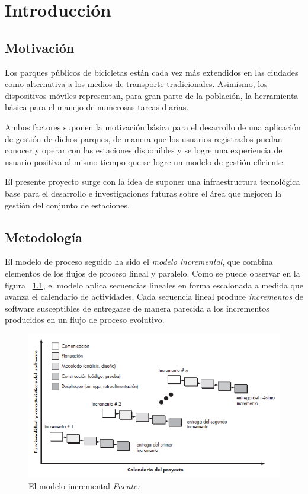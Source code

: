 \chapter{Introducción}

\section{Motivación}

Los parques públicos de bicicletas están cada vez más extendidos en las ciudades como alternativa a los medios de transporte tradicionales. Asimismo, los dispositivos móviles representan, para gran parte de la población, la herramienta básica para el manejo de numerosas tareas diarias.

Ambos factores suponen la motivación básica para el desarrollo de una aplicación de gestión de dichos parques, de manera que los usuarios registrados puedan conocer y operar con las estaciones disponibles y se logre una experiencia de usuario positiva al mismo tiempo que se logre un modelo de gestión eficiente.

El presente proyecto surge con la idea de suponer una infraestructura tecnológica base para el desarrollo e investigaciones futuras sobre el área que mejoren la gestión del conjunto de estaciones.

\section{Metodología}

El modelo de proceso seguido ha sido el \emph{modelo incremental}, que combina elementos de los flujos de proceso lineal y paralelo. Como se puede observar en la figura ~\ref{fig:procesoIncremental}, el modelo aplica secuencias lineales en forma escalonada a medida que avanza el calendario de actividades. Cada secuencia lineal produce \emph{incrementos} de software susceptibles de entregarse de manera parecida a los incrementos producidos en un flujo de proceso evolutivo.

\begin{figure}
	\centering
	\includegraphics[width=\linewidth,height=\textheight,keepaspectratio]{Images/ModeloIncremental}
	\caption[El modelo incremental]{El modelo incremental \textit{Fuente:~\cite{Pre10}}}
	\label{fig:procesoIncremental}
\end{figure}

